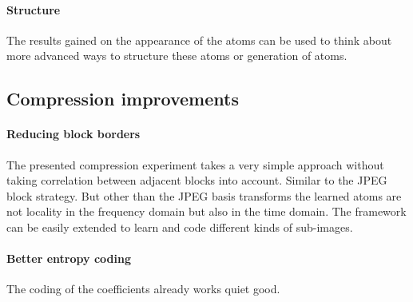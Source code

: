 \paragraph{Structure}
The results gained on the appearance of the atoms can be used to think
about more advanced ways to structure these atoms or generation of atoms.
 

\subsection{Compression improvements}


\paragraph{Reducing block borders} The presented compression experiment
takes a very simple approach without taking correlation between adjacent
blocks into account. Similar to the JPEG block strategy. But other than
the JPEG basis transforms the learned atoms are not locality in the frequency
domain but also in the time domain. 
The framework can be easily extended to
learn and code different kinds of sub-images.

\paragraph{Better entropy coding}
The coding of the coefficients already works quiet good. 












